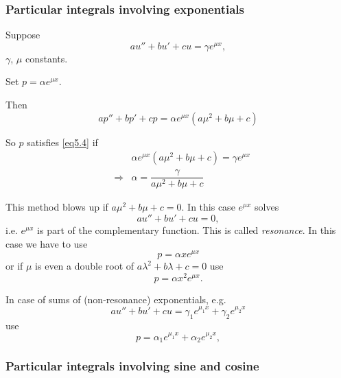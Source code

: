 
\subsubsection*{Particular integrals involving exponentials}

Suppose
\begin{equation}
au'' + bu' + cu  =  \gamma e^{\mu x},
\label{eq5.4}
\end{equation}
$\gamma$, $\mu$ constants.

Set $p = \alpha e^{\mu x}$.

Then
\[
ap'' + bp' + cp  =  \alpha e^{\mu x} (a\mu^2 + b\mu + c)
\]

So $p$ satisfies \eqref{eq5.4} if
\begin{eqnarray*}
&&\alpha  e^{\mu x} (a\mu^2 + b\mu + c) = \gamma e^{\mu x}\\
&\Rightarrow& \alpha = \dfrac{\gamma}{a\mu^2 + b\mu + c}  
\end{eqnarray*}

\begin{note}
This method blows up if $a\mu^2 + b\mu + c=0.$ In this case $e^{\mu x}$ solves
\[
 au'' + bu' + cu = 0,
\]
i.e. $e^{\mu x}$ is part of the complementary function. This is called \emph{resonance}.  In this case we have to use
\[
 p=\alpha x e^{\mu x}
\]
or if $\mu$ is even a double root of  $a\lambda^2 + b \lambda + c = 0$ use
\[
 p=\alpha x^2 e^{\mu x}.
\]

\end{note}

\begin{note}
 In case of sums of (non-resonance) exponentials, e.g.\
 \[
  au'' + bu' + cu = \gamma_1 e^{\mu_1 x} + \gamma_2 e^{\mu_2 x}
 \]
use
\[
 p = \alpha_1 e^{\mu_1 x} + \alpha_2 e^{\mu_2 x},
\]

\end{note}


\subsubsection*{Particular integrals involving sine and cosine}

